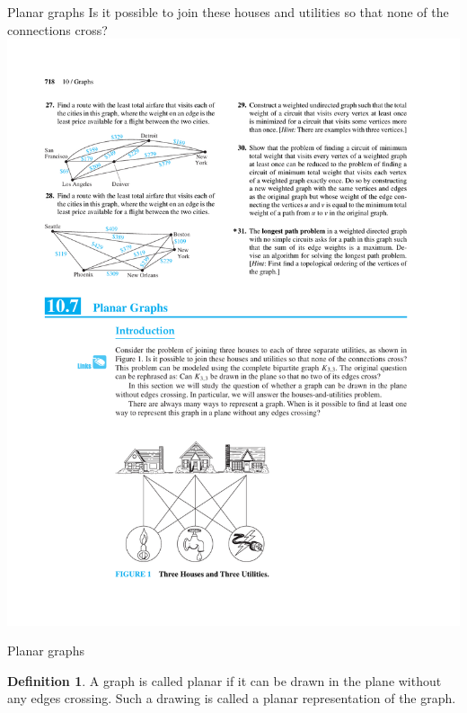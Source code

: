 \documentclass{beamer}
\theoremstyle{definition}
\newtheorem{defn}{Definition}[section]
\begin{document}
\begin{frame}{Planar graphs}
    Is it possible to join these houses and utilities so that none of the connections cross?\\
    \centering \includegraphics[trim={5cm 3cm 9cm 19cm}, clip, width=.5\linewidth]{p718}
\end{frame}

\begin{frame}{Planar graphs}
    \begin{defn}
        A graph is called planar if it can be drawn in the plane without any edges crossing. Such a drawing is called a planar representation of the graph.
    \end{defn}
\end{frame}
\end{document}
